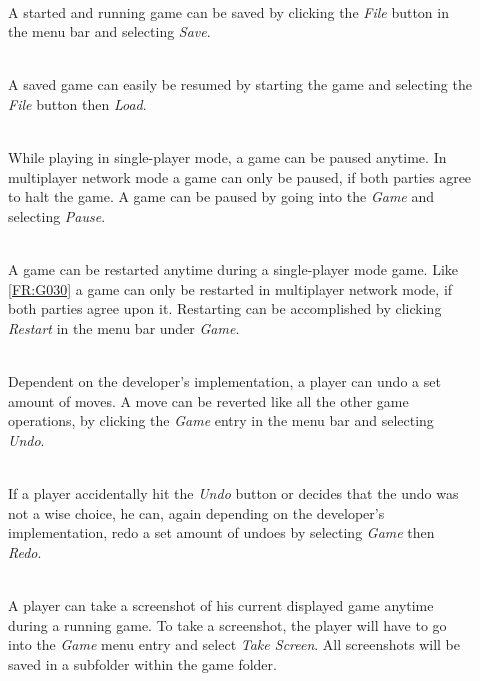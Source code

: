 \vspace{.5cm}

\begin{description}
	\item[] \textbf{} \\
   A started and running game can be saved by clicking the \emph{File} button in the menu bar and selecting \emph{Save}.
   \item[] \textbf{} \\
   A saved game can easily be resumed by starting the game and selecting the \emph{File} button then \emph{Load}.
   \item[] \textbf{} \\
   While playing in single-player mode, a game can be paused anytime. In multiplayer network mode a game can only be paused, if both parties agree to halt the game. A game can be paused by going into the \emph{Game} and selecting \emph{Pause}.
   \item[] \textbf{} \\
   A game can be restarted anytime during a single-player mode game. Like \ref{FR:G030} a game can only be restarted in multiplayer network mode, if both parties agree upon it. Restarting can be accomplished by clicking \emph{Restart} in the menu bar under \emph{Game}.
   \item[] \textbf{} \\
   Dependent on the developer's implementation, a \gls{player} can undo a set amount of moves. A move can be reverted like all the other game operations, by clicking the \emph{Game} entry in the menu bar and selecting \emph{Undo}.
   \item[] \textbf{} \\
   If a player accidentally hit the \emph{Undo} button or decides that the undo was not a wise choice, he can, again depending on the developer's implementation, redo a set amount of undoes by selecting \emph{Game} then \emph{Redo}.
   \item[] \textbf{} \\
   A player can take a screenshot of his current displayed game anytime during a running game. To take a screenshot, the player will have to go into the \emph{Game} menu entry and select \emph{Take Screen}. All screenshots will be saved in a subfolder within the game folder.
\end{description}